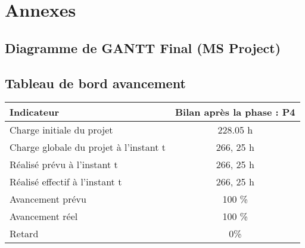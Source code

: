 \section{Annexes}

    \subsection{Diagramme de GANTT Final (MS Project)}
        

    \subsection{Tableau de bord avancement}
        \begin{tabular}{l c}
            \textbf{Indicateur} & \textbf{Bilan après la phase : P4} \\
            \hline
            Charge initiale du projet & 228.05 h \\
            Charge globale du projet à l’instant t & 266, 25 h \\
            Réalisé prévu à l’instant t & 266, 25 h \\
            Réalisé effectif à l’instant t & 266, 25 h \\
            Avancement prévu & 100 \% \\
            Avancement réel & 100 \% \\
            Retard & 0\% \\
        \end{tabular}





